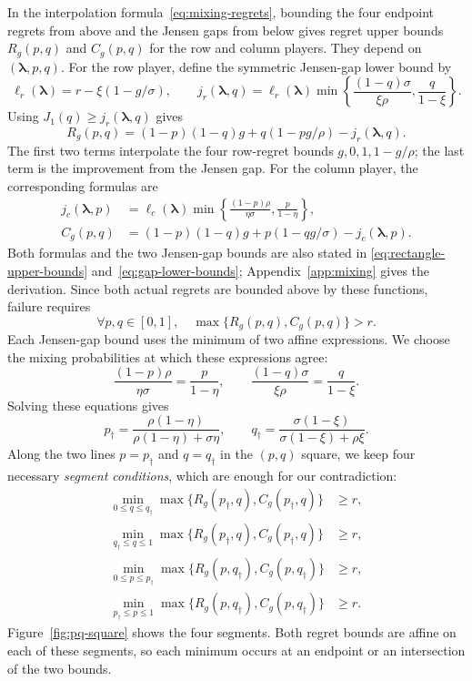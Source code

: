 \documentclass[11pt]{article}
\theoremstyle{remark}
\theoremstyle{plain}
\begin{document}
In the interpolation formula~\eqref{eq:mixing-regrets}, bounding the
four endpoint regrets from above and the Jensen gaps from below gives
regret upper bounds $R_g(p,q)$ and $C_g(p,q)$ for the row and column
players. They depend on $(\boldsymbol\lambda,p,q)$.
For the row player, define the symmetric Jensen-gap lower bound by
\[
 \ell_r(\boldsymbol\lambda)=r-\xi(1-g/\sigma),\qquad
 j_r(\boldsymbol\lambda,q)=\ell_r(\boldsymbol\lambda)\min\left\{\frac{(1-q)\sigma}{\xi\rho},\frac q{1-\xi}\right\}.
\]
Using $J_1(q)\ge j_r(\boldsymbol\lambda,q)$ gives
\[
 R_g(p,q)=(1-p)(1-q)g+q(1-pg/\rho)-j_r(\boldsymbol\lambda,q).
\]
The first two terms interpolate the four row-regret bounds
$g,0,1,1-g/\rho$; the last term is the improvement from the Jensen gap.
For the column player, the corresponding formulas are
\[
 \begin{aligned}
 j_c(\boldsymbol\lambda,p)
   &=\ell_c(\boldsymbol\lambda)
       \min\left\{\frac{(1-p)\rho}{\eta\sigma},\frac p{1-\eta}\right\},\\
 C_g(p,q)
   &=(1-p)(1-q)g+p(1-qg/\sigma)-j_c(\boldsymbol\lambda,p).
 \end{aligned}
\]
Both formulas and the two Jensen-gap bounds are also stated in
\eqref{eq:rectangle-upper-bounds} and~\eqref{eq:gap-lower-bounds};
Appendix~\ref{app:mixing} gives the derivation.
Since both actual regrets are bounded above by these functions,
failure requires
\[
 \forall p,q\in[0,1],\quad \max\{R_g(p,q),C_g(p,q)\}>r.
\]
Each Jensen-gap bound uses the minimum of two affine expressions.
We choose the mixing probabilities at which these expressions agree:
\[
 \frac{(1-p)\rho}{\eta\sigma}=\frac p{1-\eta},\qquad
 \frac{(1-q)\sigma}{\xi\rho}=\frac q{1-\xi}.
\]
Solving these equations gives
\[
 p_\dagger=\frac{\rho(1-\eta)}{\rho(1-\eta)+\sigma\eta},\qquad
 q_\dagger=\frac{\sigma(1-\xi)}{\sigma(1-\xi)+\rho\xi}.
\]
Along the two lines $p=p_\dagger$ and $q=q_\dagger$ in the $(p,q)$
square, we keep four necessary \emph{segment conditions}, which are
enough for our contradiction:
\begin{equation}
 \begin{aligned}
 \min_{0\le q\le q_\dagger}\max\{R_g(p_\dagger,q),C_g(p_\dagger,q)\}&\ge r,\\
 \min_{q_\dagger\le q\le1}\max\{R_g(p_\dagger,q),C_g(p_\dagger,q)\}&\ge r,\\
 \min_{0\le p\le p_\dagger}\max\{R_g(p,q_\dagger),C_g(p,q_\dagger)\}&\ge r,\\
 \min_{p_\dagger\le p\le1}\max\{R_g(p,q_\dagger),C_g(p,q_\dagger)\}&\ge r.
 \end{aligned}
 \label{eq:main-segment-conditions}
\end{equation}
Figure~\ref{fig:pq-square} shows the four segments.
Both regret bounds are affine on each of these segments, so each
minimum occurs at an endpoint or an intersection of the two bounds.
\end{document}
